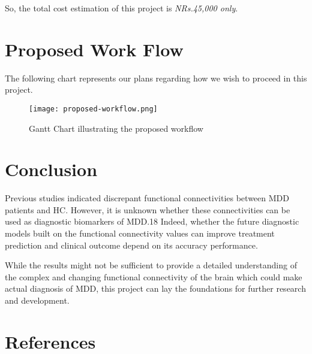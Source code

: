 \documentclass[12pt]{article}
\begin{document}
So, the total cost estimation \cite{ssdprice} of this project is
\textit{NRs.\hspace*{2pt}45,000 only}.

\newpage

\section{Proposed Work Flow}

The following chart represents our plans regarding how we wish to
proceed in this project.

\begin{figure}[H]
  \centering
  \texttt{[image: proposed-workflow.png]}
  \caption{Gantt Chart illustrating the proposed workflow}
\end{figure}

\section{Conclusion}

Previous studies indicated discrepant functional connectivities
between MDD patients and HC. However, it is unknown whether these
connectivities can be used as diagnostic biomarkers of MDD.18 Indeed,
whether the future diagnostic models built on the functional
connectivity values can improve treatment prediction and clinical
outcome depend on its accuracy performance.

While the results might not be sufficient to provide a detailed
understanding of the complex and changing functional connectivity of
the brain which could make actual diagnosis of MDD, this project can
lay the foundations for further research and development.

\newpage

\section*{References}
\printbibliography[heading=none]
\end{document}
